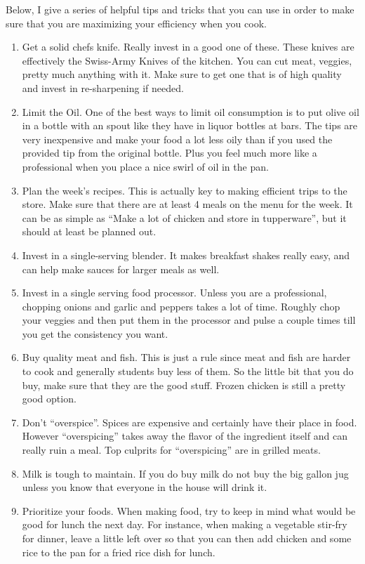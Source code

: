 

Below, I give a series of helpful tips and tricks that you can use in order to make sure that you are maximizing your efficiency when you cook. 

\begin{enumerate}
\item Get a solid chefs knife. Really invest in a good one of these. These knives are effectively the Swiss-Army Knives of the kitchen. You can cut meat, veggies, pretty much anything with it. Make sure to get one that is of high quality and invest in re-sharpening if needed.
\item Limit the Oil. One of the best ways to limit oil consumption is to put olive oil in a bottle with an spout like they have in liquor bottles at bars. The tips are very inexpensive and make your food a lot less oily than if you used the provided tip from the original bottle. Plus you feel much more like a professional when you place a nice swirl of oil in the pan. 
\item Plan the week's recipes. This is actually key to making efficient trips to the store. Make sure that there are at least 4 meals on the menu for the week. It can be as simple as ``Make a lot of chicken and store in tupperware'', but it should at least be planned out. 
\item Invest in a single-serving blender. It makes breakfast shakes really easy, and can help make sauces for larger meals as well.
\item Invest in a single serving food processor. Unless you are a professional, chopping onions and garlic and peppers takes a lot of time. Roughly chop your veggies and then put them in the processor and pulse a couple times till you get the consistency you want. 
\item Buy quality meat and fish. This is just a rule since meat and fish are harder to cook and generally students buy less of them. So the little bit that you do buy, make sure that they are the good stuff. Frozen chicken is still a pretty good option. 
\item Don't ``overspice''. Spices are expensive and certainly have their place in food. However ``overspicing'' takes away the flavor of the ingredient itself and can really ruin a meal. Top culprits for ``overspicing'' are in grilled meats. 
\item Milk is tough to maintain. If you do buy milk do not buy the big gallon jug unless you know that everyone in the house will drink it. 
\item Prioritize your foods. When making food, try to keep in mind what would be good for lunch the next day. For instance, when making a vegetable stir-fry for dinner, leave a little left over so that you can then add chicken and some rice to the pan for a fried rice dish for lunch. 
\end{enumerate}
